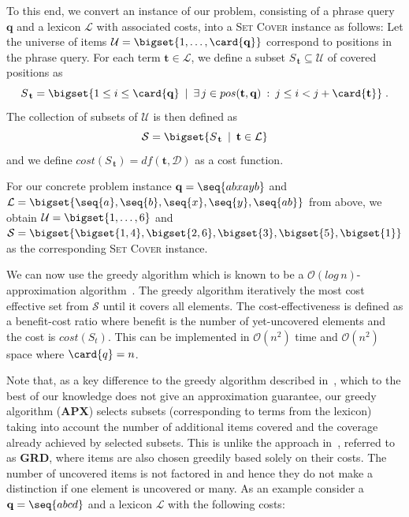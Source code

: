 
To this end, we convert an instance of our problem, consisting of a
phrase query $\mathbf{q}$ and a lexicon $\mathcal{L}$ with
associated costs, into a \textsc{Set Cover} instance as follows: Let
the universe of items
$\mathcal{U} = \bigset{1, \ldots, \card{\mathbf{q}}}$ correspond to
positions in the phrase query. For each term
$\mathbf{t} \in \mathcal{L}$, we define a subset
$S_{\,\mathbf{t}} \subseteq \mathcal{U}$ of covered positions as
$$
 S_{\,\mathbf{t}} = \bigset{1 \le i \le \card{\mathbf{q}} \:\mid\: \exists{\,j \in pos(\mathbf{t}, \mathbf{q}) \::\: j \le i < j + \card{\mathbf{t}}}}\;.
$$
The collection of subsets of $\mathcal{U}$ is then defined as
$$
\mathcal{S} = \bigset{S_{\,\mathbf{t}} \:\mid\: \mathbf{t} \in \mathcal{L}}
$$
and we define $cost(S_{\,\mathbf{t}}) = df(\mathbf{t}, \mathcal{D})$ as
a cost function.

For our concrete problem instance $\mathbf{q} = \seq{abxayb}$ and
$\mathcal{L} = \bigset{\seq{a}, \seq{b}, \seq{x}, \seq{y}, \seq{ab}}$
from above, we obtain $\mathcal{U} = \bigset{1, \ldots, 6}$ and
$\mathcal{S} = \bigset{\bigset{1, 4}, \bigset{2, 6}, \bigset{3},
  \bigset{5}, \bigset{1}}$
as the corresponding \textsc{Set Cover} instance.

We can now use the greedy algorithm which is known to be
a $\mathcal{O}(log\,n)$-approximation algorithm~\cite{Vazirani:2001fk}.
The greedy algorithm iteratively the most cost effective set from $\mathcal{S}$ until it covers all elements. The cost-effectiveness is defined as a benefit-cost ratio where benefit is the number of yet-uncovered elements and the cost is $cost(S_t)$. This can be implemented in
$\mathcal{O}(n^2)$ time and $\mathcal{O}(n^2)$ space where
$\card{q} = n$.

Note that, as a key difference to the greedy algorithm described
in~\cite{Williams:2004fk}, which to the best of our knowledge does not
give an approximation guarantee, our greedy algorithm (\textbf{APX}) selects subsets
(corresponding to terms from the lexicon) taking into account the
number of additional items covered and the coverage already achieved
by selected subsets. This is unlike the approach in~\cite{Williams:2004fk}, referred to as \textbf{GRD}, where items are also chosen greedily based solely on their costs. The number of uncovered items is not factored in and hence they do not make a distinction if one element is uncovered or many. As an example consider a $\mathbf{q} = \seq{abcd}$ and a lexicon $\mathcal{L}$ with the following costs:


